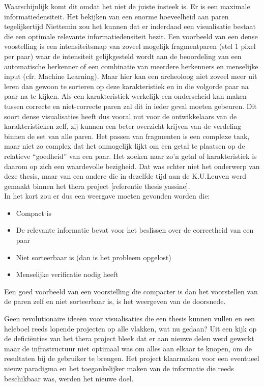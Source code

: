 Waarschijnlijk komt dit omdat het niet de juiste insteek is. Er is een maximale informatiedensiteit. Het bekijken van een enorme hoeveelheid aan paren tegelijkertijd Niettemin zou het kunnen dat er inderdaad een visualisatie bestaat die een optimale relevante informatiedensiteit bezit. Een voorbeeld van een dense voostelling is een intensiteitsmap van zoveel mogelijk fragmentparen (stel 1 pixel per paar) waar de intensiteit gelijkgesteld wordt aan de beoordeling van een automatische herkenner of een combinatie van meerdere herkenners en menselijke input (cfr. Machine Learning). Maar hier kan een archeoloog niet zoveel meer uit leren dan gewoon te sorteren op deze karakteristiek en in die volgorde paar na paar na te kijken. Als een karakteristiek werkelijk een onderscheid kan maken tussen correcte en niet-correcte paren zal dit in ieder geval moeten gebeuren. Dit soort dense visualisaties heeft dus vooral nut voor de ontwikkelaars van de karakteristieken zelf, zij kunnen een beter overzicht krijven van de verdeling binnen de set van alle paren. Het passen van fragmenten is een complexe taak, maar niet zo complex dat het onmogelijk lijkt om een getal te plaatsen op de relatieve ``goedheid'' van een paar. Het zoeken naar zo'n getal of karakteristiek is daarom op zich een waardevolle bezigheid. Dat was echter niet het onderwerp van deze thesis, maar van een andere die in dezelfde tijd aan de K.U.Leuven werd gemaakt binnen het thera project [referentie thesis yassine].\\

In het kort zou er dus een weergave moeten gevonden worden die:

\begin{itemize}
	\item Compact is
	\item De relevante informatie bevat voor het beslissen over de correctheid van een paar
	\item Niet sorteerbaar is (dan is het probleem opgelost)
	\item Menselijke verificatie nodig heeft
\end{itemize}

Een goed voorbeeld van een voorstelling die compacter is dan het voorstellen van de paren zelf en niet sorteerbaar is, is het weergeven van de doorsnede. 

Geen revolutionaire idee\"en voor visualisaties die een thesis kunnen vullen en een heleboel reeds lopende projecten op alle vlakken, wat nu gedaan? Uit een kijk op de defici\"enties van het thera project bleek dat er aan nieuwe delen werd gewerkt maar de infrastructuur niet optimaal was om alles aan elkaar te knopen, om de resultaten bij de gebruiker te brengen. Het project klaarmaken voor een eventueel nieuw paradigma en het toegankelijker maken van de informatie die reeds beschikbaar was, werden het nieuwe doel.\\

